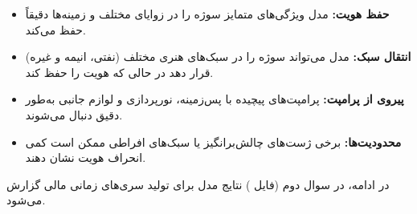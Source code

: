 \begin{itemize}
    \item \textbf{حفظ هویت:} مدل ویژگی‌های متمایز سوژه را در زوایای مختلف و زمینه‌ها دقیقاً حفظ می‌کند.
    \item \textbf{انتقال سبک:} مدل می‌تواند سوژه را در سبک‌های هنری مختلف (نفتی، انیمه و غیره) قرار دهد در حالی که هویت را حفظ کند.
    \item \textbf{پیروی از پرامپت:} پرامپت‌های پیچیده با پس‌زمینه، نورپردازی و لوازم جانبی به‌طور دقیق دنبال می‌شوند.
    \item \textbf{محدودیت‌ها:} برخی ژست‌های چالش‌برانگیز یا سبک‌های افراطی ممکن است کمی انحراف هویت نشان دهند.
\end{itemize}

\vspace{0.5cm}
در ادامه، در سوال دوم (فایل ) نتایج مدل  برای تولید سری‌های زمانی مالی گزارش می‌شود.
